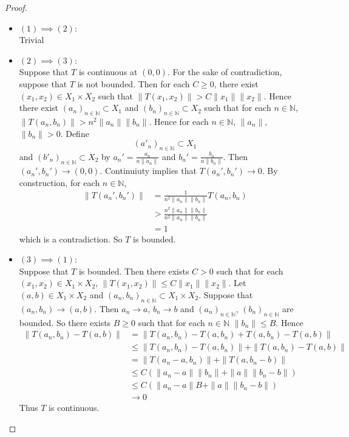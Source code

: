 \documentclass[12pt]{amsart}
\theoremstyle{definition}
\newcommand{\N}{\mathbb{N}}
\begin{document}
	\begin{proof}\
		\begin{itemize}
		\item $(1) \implies (2)$:\\
		Trivial
		\item  $(2) \implies (3)$:\\ 
		Suppose that $T$ is continuous at $(0, 0)$. For the sake of contradiction, suppose that $T$ is not bounded. Then for each $C \geq 0$, there exist $(x_1, x_2) \in X_1 \times X_2$ such that $\|T(x_1, x_2)\| > C\|x_1\| \|x_2\|$. Hence there exist $(a_n)_{n \in \N} \subset X_1$ and $(b_n)_{n \in \N} \subset X_2$ such that for each $n \in \N$, $ \| T(a_n, b_n) \| > n^2 \|a_n\| \|b_n\|$. Hence for each $n \in \N$, $\|a_n\|$, $\|b_n\| > 0$. Define $$(a'_n)_{n \in \N} \subset X_1$$ and $(b'_n)_{n \in \N} \subset X_2$ by $a_n' = \frac{a_n}{n\|a_n\|}$ and $b_n' = \frac{b_n}{n\|b_n\|}$. Then $(a_n', b_n') \rightarrow (0,0)$. Continuiuty implies that $T(a_n',b_n') \rightarrow 0$. By construction, for each $n \in \N$,
		\begin{align*}
		\|T(a_n',b_n')\| 
		&= \frac{1}{n^2 \|a_n\| \|b_n\|} T(a_n, b_n) \\
		& > \frac{n^2 \|a_n\| \|b_n\|}{n^2 \|a_n\| \|b_n\|} \\
		&= 1
		\end{align*}
		which is a contradiction. So $T$ is bounded.
		\item  $(3) \implies (1)$:\\ 
		Suppose that $T$ is bounded. Then there exists $C > 0$ such that for each $(x_1, x_2) \in X_1 \times X_2$, $\| T(x_1, x_2) \| \leq C\|x_1\| \|x_2\|$. Let $(a, b) \in X_1 \times X_2$ and $(a_n, b_n)_{n \in \N} \subset X_1 \times X_2$. Suppose that $(a_n, b_n) \rightarrow (a,b)$. Then $a_n \rightarrow a$, $b_n \rightarrow b$ and $(a_n)_{n \in \N}$, $(b_n)_{n \in \N}$ are bounded. So there exists $B \geq 0$ such that for each $n \in \N$ $\|b_n\| \leq B$. Hence 
		\begin{align*}
		\|T(a_n,b_n) - T(a,b) \|
		&= \|T(a_n,b_n) - T(a, b_n) + T(a, b_n) - T(a,b) \| \\
		& \leq \|T(a_n,b_n) - T(a, b_n) \| + \|T(a, b_n) - T(a,b) \| \\
		&= \|T(a_n - a,b_n) \| + \|T(a, b_n - b)\| \\
		& \leq C(\|a_n - a\| \|b_n\| + \|a\|\|b_n - b\|) \\
		& \leq C(\|a_n - a\| B + \|a\|\|b_n - b\|) \\
		& \rightarrow 0
		\end{align*}
		Thus $T$ is continuous. 
		\end{itemize}
	\end{proof}
	
\end{document}
